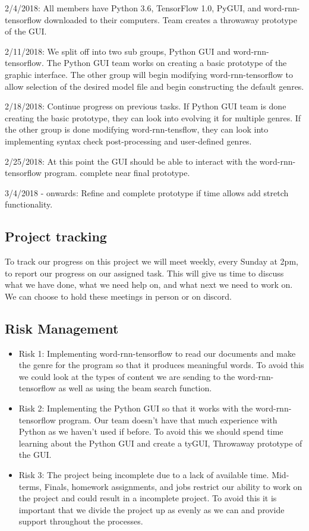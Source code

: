 \documentclass[12pt]{article}
\begin{document}
2/4/2018:
All members have Python 3.6, TensorFlow 1.0, PyGUI, and word-rnn-tensorflow downloaded to their computers.
Team creates a throwaway prototype of the GUI.

2/11/2018:
We split off into two sub groups, Python GUI and word-rnn-tensorflow.
The Python GUI team works on creating a basic prototype of the graphic interface.
The other group will begin modifying word-rnn-tensorflow to allow selection of the desired model file and begin constructing the default genres.

2/18/2018:
Continue progress on previous tasks.
If Python GUI team is done creating the basic prototype, they can look into evolving it for multiple genres.
If the other group is done modifying word-rnn-tensflow, they can look into implementing syntax check post-processing and user-defined genres.

2/25/2018:
At this point the GUI should be able to interact with the word-rnn-tensorflow program. complete near final prototype.

3/4/2018 - onwards: 
Refine and complete prototype if time allows add stretch functionality.


\subsection{Project tracking}

To track our progress on this project we will meet weekly, every Sunday at 2pm, to report our progress on our assigned task. This will give us time to discuss what we have done, what we need help on, and what next we need to work on. We can choose to hold these meetings in person or on discord.

\subsection{Risk Management}

\begin{itemize}
\item Risk 1: Implementing word-rnn-tensorflow to read our documents and make the genre for the program so that it produces meaningful words. To avoid this we could look at the types of content we are sending to the word-rnn-tensorflow as well as using the beam search function.
\item Risk 2: Implementing the Python GUI so that it works with the word-rnn-tensorflow program. Our team doesn't have that much experience with Python as we haven't used if before. To avoid this we should spend time learning about the Python GUI and create a tyGUI, Throwaway prototype of the GUI. 
\item Risk 3: The project being incomplete due to a lack of available time. Mid-terms, Finals, homework assignments, and jobs restrict our ability to work on the project and could result in a incomplete project. To avoid this it is important that we divide the project up as evenly as we can and provide support throughout the processes.
\end{itemize}
\end{document}
